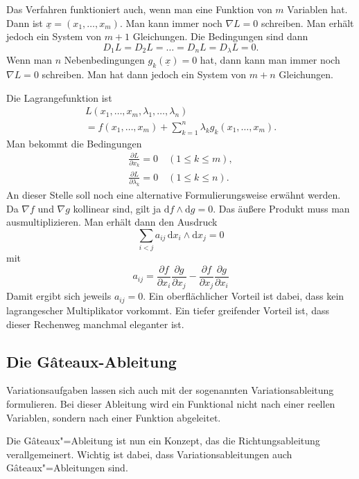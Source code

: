 \documentclass[a4paper,11pt,fleqn,twocolumn,twoside]{scrartcl}
\numberwithin{equation}{section}
\begin{document}
Das Verfahren funktioniert auch, wenn man eine Funktion von $m$
Variablen hat. Dann ist $\underline x=(x_1,\ldots,x_m).$
Man kann immer noch $\nabla L=0$ schreiben. Man erhält jedoch ein
System von $m+1$ Gleichungen. Die Bedingungen sind dann
\begin{equation}
D_1 L = D_2 L = \ldots = D_n L = D_\lambda L = 0.
\end{equation}
%
Wenn man $n$ Nebenbedingungen $g_k(\underline x)=0$ hat,
dann kann man immer noch $\nabla L=0$ schreiben.
Man hat dann jedoch ein System von $m+n$ Gleichungen.

Die Lagrangefunktion ist
\begin{gather*}
L(x_1,\ldots,x_m,\lambda_1,\ldots,\lambda_n)\\
= f(x_1,\ldots,x_m)+\sum_{k=1}^n \lambda_k g_k(x_1,\ldots,x_m).
\end{gather*}
Man bekommt die Bedingungen
\begin{gather*}
\frac{\partial L}{\partial x_k}=0 \quad (1\le k\le m),\\
\frac{\partial L}{\partial \lambda_k}=0 \quad (1\le k\le n).
\end{gather*}
An dieser Stelle soll noch eine alternative Formulierungsweise
erwähnt werden. Da $\nabla f$ und $\nabla g$ kollinear sind,
gilt ja $\mathrm df\wedge\mathrm dg=0$. Das äußere Produkt muss
man ausmultiplizieren. Man erhält dann den Ausdruck
\begin{equation}
\sum_{i<j} a_{ij}\,\mathrm dx_i\wedge\mathrm dx_j=0
\end{equation}
mit
\begin{equation}
a_{ij} = \frac{\partial f}{\partial x_i}\frac{\partial g}{\partial x_j}
-\frac{\partial f}{\partial x_j}\frac{\partial g}{\partial x_i}
\end{equation}
Damit ergibt sich jeweils $a_{ij}=0$. Ein oberflächlicher Vorteil
ist dabei, dass kein lagrangescher Multiplikator vorkommt.
Ein tiefer greifender Vorteil ist, dass dieser Rechenweg manchmal
eleganter ist.

\subsection{Die Gâteaux-Ableitung}

Variationsaufgaben lassen sich auch mit der sogenannten
Variationsableitung formulieren. Bei dieser Ableitung wird ein
Funktional nicht nach einer reellen Variablen, sondern nach einer
Funktion abgeleitet.

Die Gâteaux"=Ableitung ist nun ein Konzept, das die Richtungsableitung
verallgemeinert. Wichtig ist dabei, dass Variationsableitungen auch
Gâteaux"=Ableitungen sind.
\end{document}
